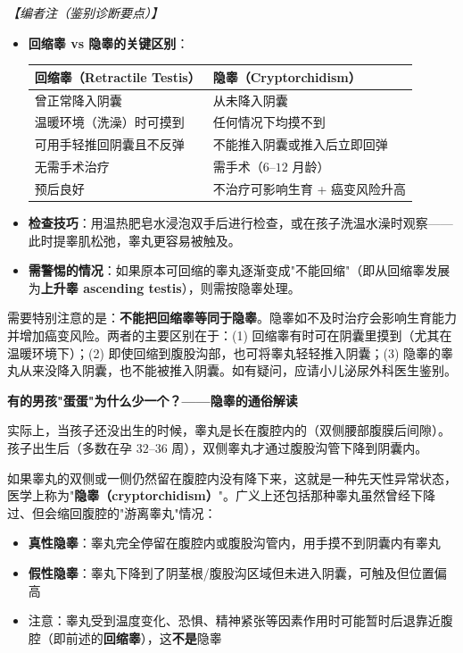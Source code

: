 \vspace{0.5em}
\noindent\textit{【编者注（鉴别诊断要点）】}
\begin{itemize}
	\item \textbf{回缩睾 vs 隐睾的关键区别}：
\begin{tabular}{|p{5cm}|p{5cm}|}
\hline
\textbf{回缩睾（Retractile Testis）} & \textbf{隐睾（Cryptorchidism）} \\
\hline
曾正常降入阴囊 & 从未降入阴囊 \\
\hline
温暖环境（洗澡）时可摸到 & 任何情况下均摸不到 \\
\hline
可用手轻推回阴囊且不反弹 & 不能推入阴囊或推入后立即回弹 \\
\hline
无需手术治疗 & 需手术（$6$--$12$ 月龄） \\
\hline
预后良好 & 不治疗可影响生育 + 癌变风险升高 \\
\hline
\end{tabular}

	\item \textbf{检查技巧}：用温热肥皂水浸泡双手后进行检查，或在孩子洗温水澡时观察——此时提睾肌松弛，睾丸更容易被触及。
	\item \textbf{需警惕的情况}：如果原本可回缩的睾丸逐渐变成"不能回缩"（即从回缩睾发展为\textbf{上升睾 ascending testis}），则需按隐睾处理。
\end{itemize}

\begin{tcolorbox}[colback=pink!5!white,colframe=red!50!black,title=贴心小叮咛]
需要特别注意的是：\textbf{不能把回缩睾等同于隐睾}。隐睾如不及时治疗会影响生育能力并增加癌变风险。两者的主要区别在于：(1) 回缩睾有时可在阴囊里摸到（尤其在温暖环境下）；(2) 即使回缩到腹股沟部，也可将睾丸轻轻推入阴囊；(3) 隐睾的睾丸从来没降入阴囊，也不能被推入阴囊。如有疑问，应请小儿泌尿外科医生鉴别。
\end{tcolorbox}

\vspace{0.3em}

\vspace{0.3em}
\vspace{0.8em}
\noindent\textbf{有的男孩"蛋蛋"为什么少一个？——隐睾的通俗解读}

实际上，当孩子还没出生的时候，睾丸是长在腹腔内的（双侧腰部腹膜后间隙）。孩子出生后（多数在孕 $32$--$36$ 周），双侧睾丸才通过腹股沟管下降到阴囊内。

如果睾丸的双侧或一侧仍然留在腹腔内没有降下来，这就是一种先天性异常状态，医学上称为"\textbf{隐睾（cryptorchidism）}"。广义上还包括那种睾丸虽然曾经下降过、但会缩回腹腔的"游离睾丸"情况：
\begin{itemize}
	\item \textbf{真性隐睾}：睾丸完全停留在腹腔内或腹股沟管内，用手摸不到阴囊内有睾丸
	\item \textbf{假性隐睾}：睾丸下降到了阴茎根/腹股沟区域但未进入阴囊，可触及但位置偏高
	\item 注意：睾丸受到温度变化、恐惧、精神紧张等因素作用时可能暂时后退靠近腹腔（即前述的\textbf{回缩睾}），这\textbf{不是}隐睾
\end{itemize}

